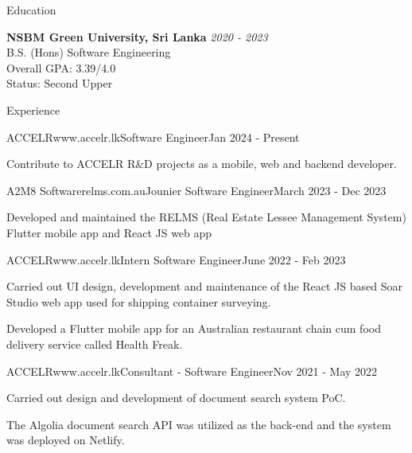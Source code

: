 \documentclass[
	11pt, %
]{./assets/resume} %
\begin{document}

\begin{rSection}{Education}

	\textbf{NSBM Green University, Sri Lanka} \hfill \textit{2020 - 2023} \\ 
	B.S. (Hons) Software Engineering \\
	Overall GPA: 3.39/4.0 \\
	Status: Second Upper
	
\end{rSection}


\begin{rSection}{Experience}

	\begin{rSubsectionX}{ACCELR}{www.accelr.lk}{Software Engineer}{Jan 2024 - Present}
		\item Contribute to ACCELR R\&D projects as a mobile, web and backend developer.  
	\end{rSubsectionX}

	\begin{rSubsectionX}{A2M8 Software}{relms.com.au}{Jounier Software Engineer}{March 2023 - Dec 2023}
		\item Developed and maintained the RELMS (Real Estate Lessee Management System) Flutter mobile app and React JS web app
	\end{rSubsectionX}

	\begin{rSubsectionX}{ACCELR}{www.accelr.lk}{Intern Software Engineer}{June 2022 - Feb 2023}
		\item Carried out UI design, development and maintenance of the React JS based Soar Studio web app used for shipping container surveying.
		\item Developed a Flutter mobile app for an Australian restaurant chain cum food delivery service called Health Freak. 
	\end{rSubsectionX}

	\begin{rSubsectionX}{ACCELR}{www.accelr.lk}{Consultant - Software Engineer}{Nov 2021 - May 2022}
		\item Carried out design and development of document search system PoC.
		\item The Algolia document search API was utilized as the back-end and the system was deployed on Netlify.
	\end{rSubsectionX}

\end{rSection}
\end{document}
